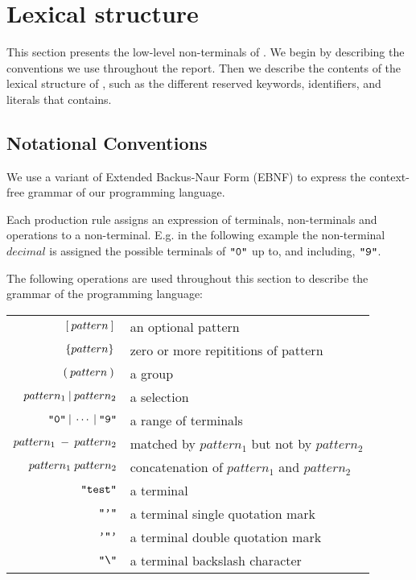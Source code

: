 \section{Lexical structure}
\label{sec:lexicalstructure}

This section presents the low-level non-terminals of \productname{}.
We begin by describing the conventions we use throughout the report. Then we
describe the contents of the lexical structure of \productname{}, such as the
different reserved keywords, identifiers, and literals that \productname{} contains.

\subsection{Notational Conventions}
We use a variant of Extended Backus-Naur Form (EBNF) to express the context-free
grammar of our programming language.

Each production rule assigns an expression of terminals, non-terminals and operations
to a non-terminal. E.g. in the following example the non-terminal $decimal$ is assigned
the possible terminals of $\texttt{"0"}$ up to, and including, $\texttt{"9"}$.

\begin{ebnf}
\end{ebnf}

The following operations are used throughout this section to describe the
grammar of the programming language:

\begin{center}
\begin{tabular}{r l}
  $[\: pattern \:] \:$ & an optional pattern \\
  $\{pattern\} \:$ & zero or more repititions of pattern \\
  $(\: pattern \:) \:$ & a group \\
  $pattern_1 \: | \: pattern_2$ & a selection \\
  $\texttt{"0"} \: | \: \cdots \: | \: \texttt{"9"}$ & a range of terminals \\
  $pattern_1 \: - \: pattern_2$ & matched by $pattern_1$ but not by $pattern_2$\\
  $pattern_1 \; pattern_2$ & concatenation of $pattern_1$ and $pattern_2$ \\
  $\texttt{"test"}$ & a terminal \\
  $\texttt{"'"}$ & a terminal single quotation mark \\
  $\texttt{'"'}$ & a terminal double quotation mark \\
  $\texttt{"\textbackslash"}$ & a terminal backslash character \\
\end{tabular}
\end{center}

